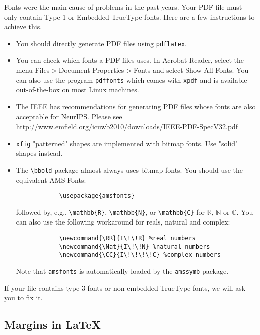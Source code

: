 \documentclass{article}
\begin{document}
	Fonts were the main cause of problems in the past years. Your PDF file must only
	contain Type 1 or Embedded TrueType fonts. Here are a few instructions to
	achieve this.
	
	\begin{itemize}
		
		\item You should directly generate PDF files using \verb+pdflatex+.
		
		\item You can check which fonts a PDF files uses.  In Acrobat Reader, select the
		menu Files$>$Document Properties$>$Fonts and select Show All Fonts. You can
		also use the program \verb+pdffonts+ which comes with \verb+xpdf+ and is
		available out-of-the-box on most Linux machines.
		
		\item The IEEE has recommendations for generating PDF files whose fonts are also
		acceptable for NeurIPS. Please see
		\url{http://www.emfield.org/icuwb2010/downloads/IEEE-PDF-SpecV32.pdf}
		
		\item \verb+xfig+ "patterned" shapes are implemented with bitmap fonts.  Use
		"solid" shapes instead.
		
		\item The \verb+\bbold+ package almost always uses bitmap fonts.  You should use
		the equivalent AMS Fonts:
		\begin{verbatim}
			\usepackage{amsfonts}
		\end{verbatim}
		followed by, e.g., \verb+\mathbb{R}+, \verb+\mathbb{N}+, or \verb+\mathbb{C}+
		for $\mathbb{R}$, $\mathbb{N}$ or $\mathbb{C}$.  You can also use the following
		workaround for reals, natural and complex:
		\begin{verbatim}
			\newcommand{\RR}{I\!\!R} %real numbers
			\newcommand{\Nat}{I\!\!N} %natural numbers
			\newcommand{\CC}{I\!\!\!\!C} %complex numbers
		\end{verbatim}
		Note that \verb+amsfonts+ is automatically loaded by the \verb+amssymb+ package.
		
	\end{itemize}
	
	If your file contains type 3 fonts or non embedded TrueType fonts, we will ask
	you to fix it.
	
	\subsection{Margins in \LaTeX{}}
	
\end{document}
